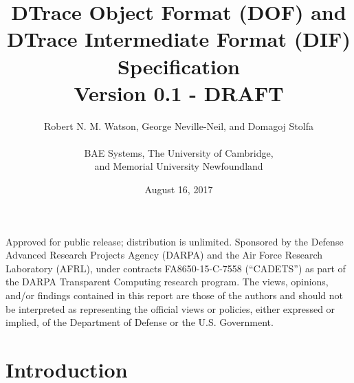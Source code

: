 


\title{DTrace Object Format (DOF) and \\
  DTrace Intermediate Format (DIF) \\
  Specification \\
  {\large Version 0.1 - DRAFT}
}

\date{August 16, 2017}

\author{
  Robert N. M. Watson, George Neville-Neil, and Domagoj Stolfa \\
  \\
  BAE Systems, The University of Cambridge, \\
    and Memorial University Newfoundland
}

\begin{minipage}[h]{\textwidth}
  \maketitle

  \vspace{2in}
  {\small
  Approved for public release; distribution is unlimited.
  Sponsored by the Defense Advanced Research Projects Agency (DARPA) and the
  Air Force Research Laboratory (AFRL), under contracts FA8650-15-C-7558
  (``CADETS'') as part of the DARPA Transparent Computing research program.
  The views, opinions, and/or findings contained in this report are those of the
  authors and should not be interpreted as representing the official views or
  policies, either expressed or implied, of the Department of Defense
  or the U.S. Government.}
\end{minipage}

\normalsize



\clearpage



\clearpage



\clearpage

\tableofcontents

\clearpage

\chapter{Introduction}
\label{chap:introduction}


